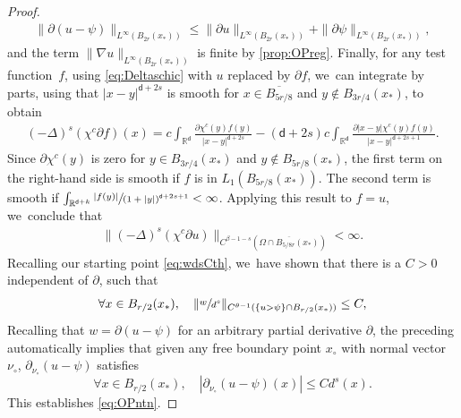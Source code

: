 \documentclass[JEP,XML,SOM,Unicode,published]{cedram}
\theoremstyle{plain}
\theoremstyle{definition}
\newcommand{\R}{{\mathbb{R}}}
\let\be\beta
\let\nab\nabla
\let\p\partial
\let\ol\overline
\let\k k
\renewcommand{\d}{\mathsf{d}}
\begin{document}
\begin{proof}
\begin{align*}
\|\p(u-\psi)\|_{L^\infty(B_{2r}(x_*))} \le \|\p u\|_{L^\infty(B_{2r}(x_*))} + \|\p\psi\|_{L^\infty(B_{2r}(x_*))},
\end{align*}
and the term $\|\nab u\|_{L^\infty(B_{2r}(x_*))}$ is finite by \cref{prop:OPreg}. Finally, for any test function~$f$, using \eqref{eq:Deltaschic} with $u$ replaced by $\p f$, we~can integrate by parts, using that $|x-y|^{\d+2s}$ is smooth for $x \in \ol{B_{5r/8}}$ and $y\notin B_{3r/4}(x_*)$, to obtain
\begin{align*}
(-\Delta)^s(\chi^c \p f)(x) = c\int_{\R^\d}\frac{\p\chi^c(y)f(y)}{|x-y|^{\d+2s}} -(\d+2s) c\int_{\R^\d} \frac{\p|x-y| \chi^c(y)f(y)}{|x-y|^{\d+2s+1}}.
\end{align*}
Since $\p\chi^c(y)$ is zero for $y\in B_{3r/4}(x_*)$ and $y\notin B_{5r/8}(x_*)$, the first term on the right-hand side is smooth if $f$ is in $L_1(B_{5r/8}(x_*))$. The second term is smooth if $\int_{\R^{\d+\k}}\sfrac{|f(y)|}{(1+|y|)^{\d+2s+1}}<\infty$. Applying this result to {$f=u$}, we~conclude that
\begin{align*}
\|(-\Delta)^s(\chi^c\p {u})\|_{C^{\be-1-s}(\ol{\Omega\cap B_{5/8r}(x_*)})} <\infty.
\end{align*}
Recalling our starting point \eqref{eq:wdsCth}, we~have shown that there is a $C>0$ independent of $\p$, such that
\begin{equation}\label{eq:wdsCth'}
\forall x\in B_{r/2}(x_*), \quad \|\sfrac{w}{d^s}\|_{C^{\theta-1}(\{u>\psi\}\cap B_{r/2}(x_*))} \le C,
\end{equation}
{Recalling that $w=\p(u-\psi)$ for an arbitrary partial derivative $\p$,} the preceding automatically implies that given any free boundary point $x_\circ$ with normal vector $\nu_{\circ}$, $\p_{\nu_\circ}(u-\psi)$ satisfies
\begin{equation*}
\forall x\in B_{r/2}(x_*), \quad |\p_{\nu_{\circ}}(u-\psi)(x)|\le C d^s(x).
\end{equation*}
This establishes \eqref{eq:OPntn}.


\end{proof}
\end{document}
